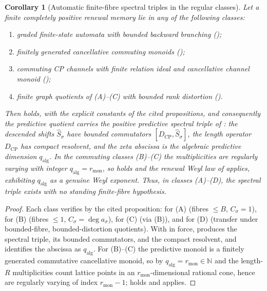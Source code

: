 \documentclass[11pt]{article}
\newtheorem{corollary}[theorem]{Corollary}
\theoremstyle{definition}
\theoremstyle{remark}
\newcommand{\N}{\mathbb{N}}
\newcommand{\CP}{\mathrm{CP}}
\newcommand{\qalg}{q_{\mathrm{alg}}}
\newcommand{\rmon}{r_{\mathrm{mon}}}
\begin{document}
\begin{corollary}[Automatic finite-fibre spectral triples in the regular classes]
\label{cor:automatic-triples}
Let a finite completely positive renewal memory lie in any of the following
classes:
\begin{enumerate}[label=\textup{(\Alph*)},leftmargin=2.4em]
\item graded finite-state automata with bounded backward branching
      \textup{(}\textup{)};
\item finitely generated cancellative commuting monoids
      \textup{(}\textup{)};
\item commuting CP channels with finite relation ideal and cancellative channel
      monoid \textup{(}\textup{)};
\item finite graph quotients of \textup{(A)--(C)} with bounded rank distortion
      \textup{(}\textup{)}.
\end{enumerate}
Then  holds, with the explicit constants of the cited
propositions, and consequently the predictive quotient carries the positive
predictive spectral triple of : the descended shifts
$\widehat S_\sigma$ have bounded commutators $[D_{\CP},\widehat S_\sigma]$, the
length operator $D_{\CP}$ has compact resolvent, and the zeta abscissa is the
algebraic predictive dimension $\qalg$.  In the commuting classes
\textup{(B)--(C)} the multiplicities are regularly varying with integer
$\qalg=\rmon$, so  holds and the renewal Weyl law of
 applies, exhibiting $\qalg$ as a genuine Weyl exponent.
Thus, in classes \textup{(A)--(D)}, the spectral triple exists with no standing
finite-fibre hypothesis.
\end{corollary}

\begin{proof}
Each class verifies  by the cited proposition:
 for (A) \textup{(}fibres $\le B$, $C_\sigma=1$\textup{)},
 for (B) \textup{(}fibres $\le1$,
$C_\sigma=\deg a_\sigma$\textup{)},
 for (C) \textup{(}via
(B)\textup{)}, and  for (D) \textup{(}transfer under
bounded-fibre, bounded-distortion quotients\textup{)}.  With  in
force,  produces the spectral triple, its bounded commutators,
and the compact resolvent, and identifies the abscissa as $\qalg$.  For (B)--(C)
the predictive monoid is a finitely generated commutative cancellative monoid, so
by  $\qalg=\rmon\in\N$ and the length-$R$ multiplicities count
lattice points in an $\rmon$-dimensional rational cone, hence are regularly varying of
index $\rmon-1$;  holds and  applies.
\end{proof}
\end{document}
